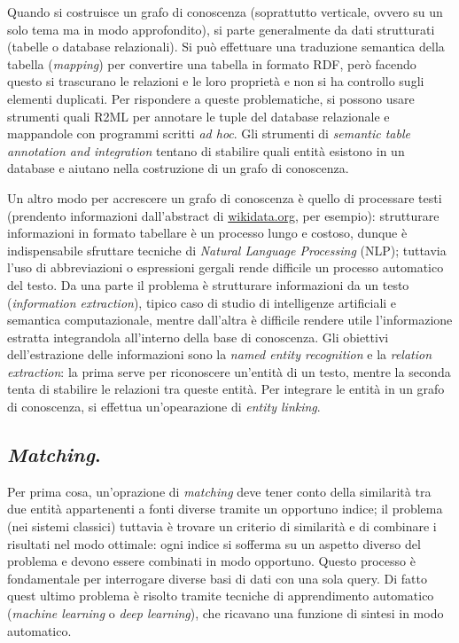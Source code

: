 \documentclass[11pt]{article}
\begin{document}
Quando si costruisce un grafo di conoscenza (soprattutto verticale, ovvero su un solo tema ma in modo approfondito), si parte generalmente da dati strutturati (tabelle o database relazionali).
Si può effettuare una traduzione semantica della tabella (\textit{mapping}) per convertire una tabella in formato RDF, però facendo questo si trascurano le relazioni e le loro proprietà e non si ha controllo sugli elementi duplicati.
Per rispondere a queste problematiche, si possono usare strumenti quali R2ML per annotare le tuple del database relazionale e mappandole con programmi scritti \textit{ad hoc}.
Gli strumenti di \textit{semantic table annotation and integration} tentano di stabilire quali entità esistono in un database e aiutano nella costruzione di un grafo di conoscenza.

Un altro modo per accrescere un grafo di conoscenza è quello di processare testi (prendento informazioni dall'abstract di \url{wikidata.org}, per esempio): strutturare informazioni in formato tabellare è un processo lungo e costoso, dunque è indispensabile sfruttare tecniche di \textit{Natural Language Processing} (NLP); tuttavia l'uso di abbreviazioni o espressioni gergali rende difficile un processo automatico del testo.
Da una parte il problema è strutturare informazioni da un testo (\textit{information extraction}), tipico caso di studio di intelligenze artificiali e semantica computazionale, mentre dall'altra è difficile rendere utile l'informazione estratta integrandola all'interno della base di conoscenza.
Gli obiettivi dell'estrazione delle informazioni sono la \textit{named entity recognition} e la \textit{relation extraction}: la prima serve per riconoscere un'entità di un testo, mentre la seconda tenta di stabilire le relazioni tra queste entità.
Per integrare le entità in un grafo di conoscenza, si effettua un'opearazione di \textit{entity linking}.

\subsection{\textit{Matching}.}
Per prima cosa, un'oprazione di \textit{matching} deve tener conto della similarità tra due entità appartenenti a fonti diverse tramite un opportuno indice; il problema (nei sistemi classici) tuttavia è trovare un criterio di similarità e di combinare i risultati nel modo ottimale: ogni indice si sofferma su un aspetto diverso del problema e devono essere combinati in modo opportuno.
Questo processo è fondamentale per interrogare diverse basi di dati con una sola query.
Di fatto quest ultimo problema è risolto tramite tecniche di apprendimento automatico (\textit{machine learning} o \textit{deep learning}), che ricavano una funzione di sintesi in modo automatico.
\end{document}
